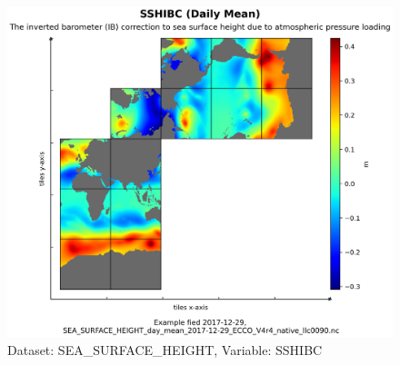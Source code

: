 \begin{figure}[H]
\centering
\includegraphics[scale=0.55]{../images/plots/native_plots/Sea_Surface_Height/SSHIBC.png}
\caption{Dataset: SEA\_SURFACE\_HEIGHT, Variable: SSHIBC}
\label{tab:table-SEA_SURFACE_HEIGHT_SSHIBC-Plot}
\end{figure}
\pagebreak
